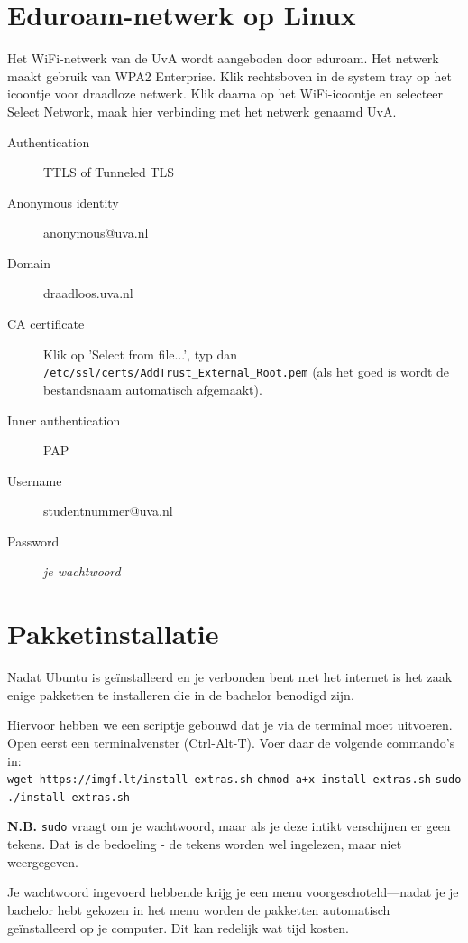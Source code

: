 \documentclass[10pt,a4paper]{article}
\begin{document}
\section{Eduroam-netwerk op Linux}

Het WiFi-netwerk van de UvA wordt aangeboden door eduroam.
Het netwerk maakt gebruik van WPA2 Enterprise. Klik rechtsboven in de system tray op het icoontje voor draadloze netwerk. Klik daarna op het WiFi-icoontje en selecteer Select Network, maak hier verbinding met het netwerk genaamd UvA.

\begin{description}
 \item[Authentication] TTLS of Tunneled TLS
 \item[Anonymous identity] anonymous@uva.nl
 \item[Domain] draadloos.uva.nl
 \item[CA certificate] Klik op 'Select from file...', typ dan \verb|/etc/ssl/certs/AddTrust_External_Root.pem| (als het goed is wordt de bestandsnaam automatisch afgemaakt).
 \item[Inner authentication] PAP
 \item[Username] studentnummer@uva.nl
 \item[Password] \textit{je wachtwoord}
\end{description}

\section{Pakketinstallatie}
Nadat Ubuntu is geïnstalleerd en je verbonden bent met het internet is het zaak enige pakketten te installeren die in de bachelor benodigd zijn.

Hiervoor hebben we een scriptje gebouwd dat je via de terminal moet uitvoeren. Open eerst een terminalvenster (Ctrl-Alt-T). Voer daar de volgende commando's in:\\

\noindent\verb|wget https://imgf.lt/install-extras.sh|\newline
\verb|chmod a+x install-extras.sh|\newline
\verb|sudo ./install-extras.sh|\newline

\textbf{N.B.} \texttt{sudo} vraagt om je wachtwoord, maar als je deze intikt verschijnen er geen tekens. Dat is de bedoeling - de tekens worden wel ingelezen, maar niet weergegeven.

Je wachtwoord ingevoerd hebbende krijg je een menu voorgeschoteld---nadat je je bachelor hebt gekozen in het menu worden de pakketten automatisch geïnstalleerd op je computer. Dit kan redelijk wat tijd kosten.
\end{document}
